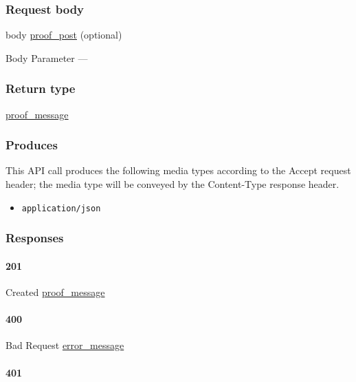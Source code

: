 \hypertarget{request-body-39}{%
\subsubsection{Request body}\label{request-body-39}}

body \protect\hyperlink{proof_post}{proof\_post} (optional)

{Body Parameter} ---

\hypertarget{return-type-94}{%
\subsubsection{Return type}\label{return-type-94}}

\protect\hyperlink{proof_message}{proof\_message}

\hypertarget{produces-121}{%
\subsubsection{Produces}\label{produces-121}}

This API call produces the following media types according to the
{Accept} request header; the media type will be conveyed by the
{Content-Type} response header.

\begin{itemize}
\tightlist
\item
  \texttt{application/json}
\end{itemize}

\hypertarget{responses-124}{%
\subsubsection{Responses}\label{responses-124}}

\hypertarget{section-404}{%
\paragraph{201}\label{section-404}}

Created \protect\hyperlink{proof_message}{proof\_message}

\hypertarget{section-405}{%
\paragraph{400}\label{section-405}}

Bad Request \protect\hyperlink{error_message}{error\_message}

\hypertarget{section-406}{%
\paragraph{401}\label{section-406}}

